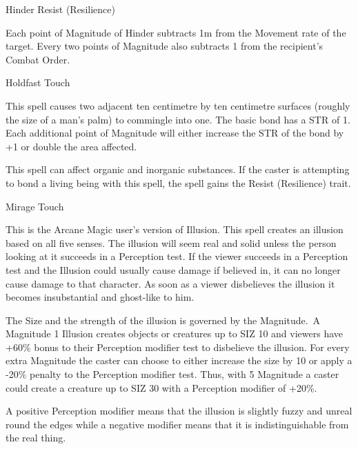 \begin{rpg-spell}
{Hinder}
{Resist (Resilience)}

Each point of Magnitude of Hinder subtracts 1m from the Movement rate of the target. Every two points of Magnitude also subtracts 1 from the recipient’s Combat Order.
\end{rpg-spell}


\begin{rpg-spell}
{Holdfast}
{Touch}

This spell causes two adjacent ten centimetre by ten centimetre surfaces (roughly the size of a man’s palm) to commingle into one. The basic bond has a STR of 1. Each additional point of Magnitude will either increase the STR of the bond by +1 or double the area affected. 

This spell can affect organic and inorganic substances. If the caster is attempting to bond a living being with this spell, the spell gains the Resist (Resilience) trait.
\end{rpg-spell}


\begin{rpg-spell}
{Mirage}
{Touch}

This is the Arcane Magic user’s version of Illusion. This spell creates an illusion based on all five senses. The illusion will seem real and solid unless the person looking at it succeeds in a Perception test. If the viewer succeeds in a Perception test and the Illusion could usually cause damage if believed in, it can no longer cause damage to that character. As soon as a viewer disbelieves the illusion it becomes insubstantial and ghost-like to him.

The Size and the strength of the illusion is governed by the Magnitude. A Magnitude 1 Illusion creates objects or creatures up to SIZ 10 and viewers have +60\% bonus to their Perception modifier test to disbelieve the illusion. For every extra Magnitude the caster can choose to either increase the size by 10 or apply a -20\% penalty to the Perception modifier test. Thus, with 5 Magnitude a caster could create a creature up to SIZ 30 with a Perception modifier of +20\%.
	
A positive Perception modifier means that the illusion is slightly fuzzy and unreal round the edges while a negative modifier means that it is indistinguishable from the real thing.
\end{rpg-spell}


